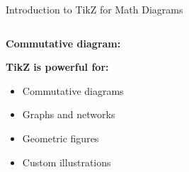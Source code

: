 \begin{frame}[fragile]{Introduction to TikZ for Math Diagrams}
\begin{columns}
\begin{column}{0.5\textwidth}
               \textbf{Commutative diagram:}
               \begin{center}
               \end{center}
               
               \textbf{TikZ is powerful for:}
               \begin{itemize}
                    \item Commutative diagrams
                    \item Graphs and networks
                    \item Geometric figures
                    \item Custom illustrations
               \end{itemize}
          \end{column}
     \end{columns}
\end{frame}

